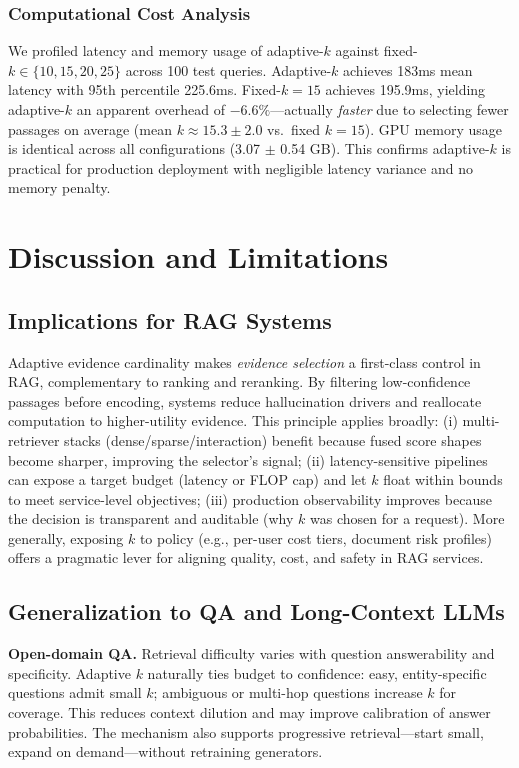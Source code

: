 \documentclass[11pt,a4paper]{article}
\begin{document}
\subsubsection{Computational Cost Analysis}
We profiled latency and memory usage of adaptive-$k$ against fixed-$k \in \{10, 15, 20, 25\}$ across 100 test queries. Adaptive-$k$ achieves 183ms mean latency with 95th percentile 225.6ms. Fixed-$k=15$ achieves 195.9ms, yielding adaptive-$k$ an apparent overhead of $-6.6\%$---actually \emph{faster} due to selecting fewer passages on average (mean $k \approx 15.3 \pm 2.0$ vs.\ fixed $k=15$). GPU memory usage is identical across all configurations (3.07 $\pm$ 0.54 GB). This confirms adaptive-$k$ is practical for production deployment with negligible latency variance and no memory penalty.

\section{Discussion and Limitations}
\label{sec:discussion}

\subsection{Implications for RAG Systems}

Adaptive evidence cardinality makes \emph{evidence selection} a first-class control in RAG, complementary to ranking and reranking. By filtering low-confidence passages before encoding, systems reduce hallucination drivers and reallocate computation to higher-utility evidence. This principle applies broadly: (i) multi-retriever stacks (dense/sparse/interaction) benefit because fused score shapes become sharper, improving the selector’s signal; (ii) latency-sensitive pipelines can expose a target budget (latency or FLOP cap) and let $k$ float within bounds to meet service-level objectives; (iii) production observability improves because the decision is transparent and auditable (why $k$ was chosen for a request). More generally, exposing $k$ to policy (e.g., per-user cost tiers, document risk profiles) offers a pragmatic lever for aligning quality, cost, and safety in RAG services.

\subsection{Generalization to QA and Long-Context LLMs}

\textbf{Open-domain QA.} Retrieval difficulty varies with question answerability and specificity. Adaptive $k$ naturally ties budget to confidence: easy, entity-specific questions admit small $k$; ambiguous or multi-hop questions increase $k$ for coverage. This reduces context dilution and may improve calibration of answer probabilities. The mechanism also supports progressive retrieval—start small, expand on demand—without retraining generators.
\end{document}
